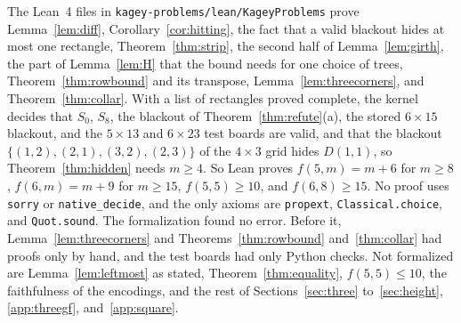 The Lean~4 files in \nolinkurl{kagey-problems/lean/KageyProblems} prove Lemma~\ref{lem:diff},
Corollary~\ref{cor:hitting}, the fact that a valid blackout hides at most one rectangle,
Theorem~\ref{thm:strip}, the second half of Lemma~\ref{lem:girth}, the part of Lemma~\ref{lem:H}
that the bound needs for one choice of trees, Theorem~\ref{thm:rowbound} and its transpose,
Lemma~\ref{lem:threecorners}, and Theorem~\ref{thm:collar}. With a list of rectangles proved
complete, the kernel decides that $S_0$, $S_8$, the blackout of Theorem~\ref{thm:refute}(a), the
stored $6\times15$ blackout, and the $5\times13$ and $6\times23$ test boards are valid, and that
the blackout $\{(1,2),\allowbreak(2,1),\allowbreak(3,2),\allowbreak(2,3)\}$ of the $4\times3$
grid hides $D(1,1)$, so Theorem~\ref{thm:hidden} needs $m\ge4$. So Lean proves $f(5,m)=m+6$ for
$m\ge8$, $f(6,m)=m+9$ for $m\ge15$, $f(5,5)\ge10$, and $f(6,8)\ge15$. No proof uses
\texttt{sorry} or \texttt{native\_decide}, and the only axioms are \texttt{propext},
\texttt{Classical.choice}, and \texttt{Quot.sound}. The formalization found no error. Before it,
Lemma~\ref{lem:threecorners} and Theorems~\ref{thm:rowbound} and~\ref{thm:collar} had proofs only
by hand, and the test boards had only Python checks. Not formalized are Lemma~\ref{lem:leftmost}
as stated, Theorem~\ref{thm:equality}, $f(5,5)\le10$, the faithfulness of the encodings, and the
rest of Sections~\ref{sec:three} to~\ref{sec:height}, \ref{app:threegf}, and~\ref{app:square}.

